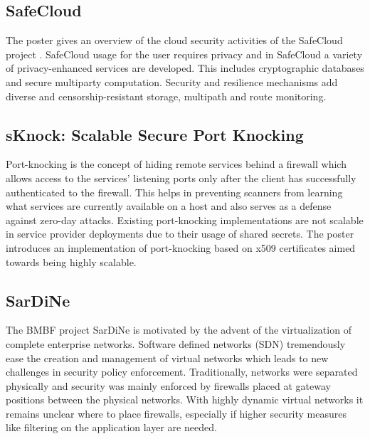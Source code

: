 
\subsection{SafeCloud}

The poster gives an overview of the cloud security activities of the SafeCloud
project \cite{safecloud}. SafeCloud usage for the user requires privacy and in
SafeCloud a variety of privacy-enhanced services are developed. This includes
cryptographic databases and secure multiparty computation.  Security and
resilience mechanisms add diverse and censorship-resistant storage, multipath
and route monitoring.


\subsection{sKnock: Scalable Secure Port Knocking}

Port-knocking  is  the  concept  of  hiding  remote  services behind   a
firewall   which   allows   access   to   the   services’ listening ports only
after the client has successfully authenticated to  the firewall.  This  helps
in  preventing  scanners  from  learning what services  are  currently
available  on  a  host  and  also  serves as a  defense  against  zero-day
attacks.  Existing  port-knocking implementations are not scalable in service
provider deployments due to their usage of shared secrets. The poster
introduces an  implementation \cite{dsel:mcsp:2016} of port-knocking  based
on x509 certificates aimed towards  being highly  scalable.


\subsection{SarDiNe}

The BMBF project SarDiNe is motivated by the advent of the virtualization of
complete enterprise networks. Software defined networks (SDN) tremendously
ease the creation and management of virtual networks which leads to new
challenges in security policy enforcement. Traditionally, networks were
separated physically and security was mainly enforced by firewalls placed at
gateway positions between the physical networks. With highly dynamic virtual
networks it remains unclear where to place firewalls, especially if higher
security measures like filtering on the application layer are needed.

